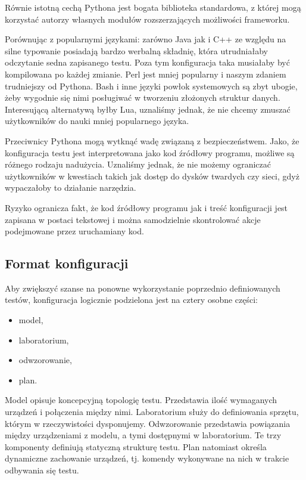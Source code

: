 \documentclass[00-praca-magisterska.tex]{subfiles}
\begin{document}
Równie istotną cechą Pythona jest bogata biblioteka standardowa, z której mogą
korzystać autorzy własnych modułów rozszerzających możliwości frameworku.

Porównując z popularnymi językami: zarówno Java jak i C++ ze względu na
silne typowanie posiadają bardzo werbalną składnię, która utrudniałaby
odczytanie sedna zapisanego testu. Poza tym konfiguracja taka musiałaby być
kompilowana po każdej zmianie. Perl jest mniej popularny i naszym zdaniem
trudniejszy od Pythona. Bash i inne języki powłok systemowych są zbyt ubogie,
żeby wygodnie się nimi posługiwać w tworzeniu złożonych struktur danych.
Interesującą alternatywą byłby Lua, uznaliśmy jednak, że nie chcemy zmuszać
użytkowników do nauki mniej popularnego języka.

Przeciwnicy Pythona mogą wytknąć wadę związaną z bezpieczeństwem. Jako, że
konfiguracja testu jest interpretowana jako kod źródłowy programu, możliwe są
różnego rodzaju nadużycia. Uznaliśmy jednak, że nie możemy ograniczać
użytkowników w kwestiach takich jak dostęp do dysków twardych czy sieci, gdyż
wypaczałoby to działanie narzędzia.

Ryzyko ogranicza fakt, że kod źródłowy programu jak i treść konfiguracji jest
zapisana w postaci tekstowej i można samodzielnie skontrolować akcje
podejmowane przez uruchamiany kod.

\label{arete-master-config-format}
\subsection{Format konfiguracji}

Aby zwiększyć szanse na ponowne wykorzystanie poprzednio definiowanych
testów, konfiguracja logicznie podzielona jest na cztery osobne części:
\begin{itemize}
\item model,
\item laboratorium,
\item odwzorowanie, 
\item plan.
\end{itemize}

Model opisuje koncepcyjną topologię testu. Przedstawia ilość wymaganych
urządzeń i połączenia między nimi. Laboratorium służy do definiowania sprzętu,
którym w rzeczywistości dysponujemy. Odwzorowanie przedstawia powiązania między
urządzeniami z modelu, a tymi dostępnymi w laboratorium. Te trzy komponenty
definiują statyczną strukturę testu. Plan natomiast określa dynamiczne
zachowanie urządzeń, tj.  komendy wykonywane na nich w trakcie odbywania się
testu.
\end{document}
